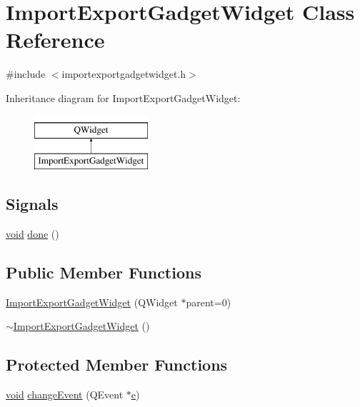 \hypertarget{class_import_export_gadget_widget}{\section{Import\-Export\-Gadget\-Widget Class Reference}
\label{class_import_export_gadget_widget}
}


{\ttfamily \#include $<$importexportgadgetwidget.\-h$>$}

Inheritance diagram for Import\-Export\-Gadget\-Widget\-:\begin{figure}[H]
\begin{center}
\leavevmode
\includegraphics[height=2.000000cm]{class_import_export_gadget_widget}
\end{center}
\end{figure}
\subsection*{Signals}
\begin{DoxyCompactItemize}
\item 
\hyperlink{group___u_a_v_objects_plugin_ga444cf2ff3f0ecbe028adce838d373f5c}{void} \hyperlink{class_import_export_gadget_widget_a56d9e25717ccdedcbc394a2cec2c7e58}{done} ()
\end{DoxyCompactItemize}
\subsection*{Public Member Functions}
\begin{DoxyCompactItemize}
\item 
\hyperlink{group__importexportplugin_gaa6f8e207b497782f1c00bebfcdf362e6}{Import\-Export\-Gadget\-Widget} (Q\-Widget $\ast$parent=0)
\item 
\hyperlink{group__importexportplugin_ga96b1b166720e190f43ce5a83b0440ba8}{$\sim$\-Import\-Export\-Gadget\-Widget} ()
\end{DoxyCompactItemize}
\subsection*{Protected Member Functions}
\begin{DoxyCompactItemize}
\item 
\hyperlink{group___u_a_v_objects_plugin_ga444cf2ff3f0ecbe028adce838d373f5c}{void} \hyperlink{group__importexportplugin_gac24ae66f22b367d4a3854a11092b6732}{change\-Event} (Q\-Event $\ast$\hyperlink{_o_p_plots_8m_a9425be9aab51621e317ba7ade564b570}{e})
\end{DoxyCompactItemize}



